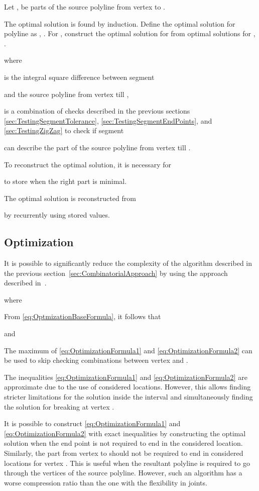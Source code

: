 \documentclass[conference]{IEEEtran}
\begin{document}
Let ,  be parts of the source polyline from vertex  to .

The optimal solution is found by induction.
Define the optimal solution for polyline  as
,
.
For , construct the optimal solution for  from optimal solutions for , .

where

is the integral square difference between segment

and the source polyline from vertex  till ,

is a combination of checks described in the previous sections \ref{sec:TestingSegmentTolerance}, \ref{sec:TestingSegmentEndPoints}, and \ref{sec:TestingZigZag} to check if segment

can describe the part of the source polyline from vertex  till .

To reconstruct the optimal solution, it is necessary for

to store  when the right part is minimal.

The optimal solution is reconstructed from

by recurrently using stored  values.

\subsection
{
  Optimization
  \label{sec:Optimization}
}

It is possible to significantly reduce the complexity of the algorithm described in the previous section~\ref{sec:CombinatorialApproach} by using the approach described in~\cite{PolylineGeneralizationCombinatorical}.

where


From \eqref{eq:OptmizationBaseFormula}, it follows that

and


The maximum of \eqref{eq:OptimizationFormula1} and \eqref{eq:OptimizationFormula2} can be used to skip checking combinations between vertex  and .

The inequalities \eqref{eq:OptimizationFormula1} and \eqref{eq:OptimizationFormula2} are approximate due to the use of considered locations. However, this allows finding stricter limitations for the solution inside the interval and simultaneously finding the solution for breaking at vertex .

It is possible to construct \eqref{eq:OptimizationFormula1} and \eqref{eq:OptimizationFormula2} with exact inequalities by constructing the optimal solution when the end point is not required to end in the considered location. Similarly, the part from vertex  to  should not be required to end in considered locations for vertex . This is useful when the resultant polyline is required to go through the vertices of the source polyline. However, such an algorithm has a worse compression ratio than the one with the flexibility in joints.
\end{document}
